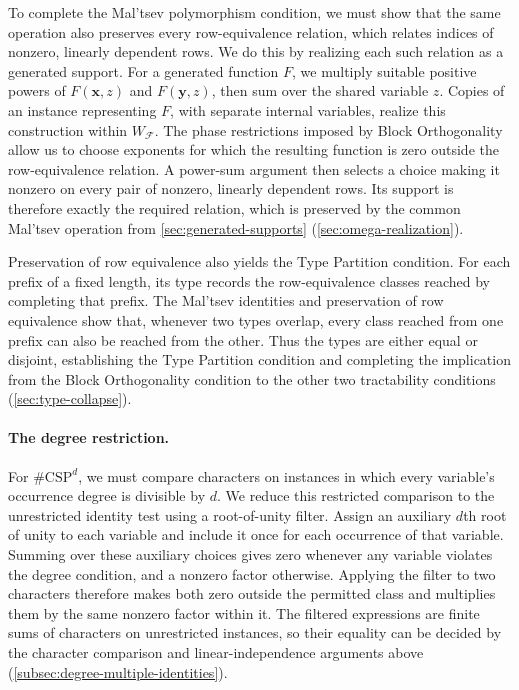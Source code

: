 \documentclass[11pt,letterpaper,onecolumn]{article}
\theoremstyle{plain}
\theoremstyle{definition}
\theoremstyle{remark}
\newcommand{\cF}{\mathcal F}
\begin{document}
To complete the Mal'tsev polymorphism condition, we must show that the same
operation also preserves every row-equivalence relation, which relates
indices of nonzero, linearly dependent rows.  We do this by realizing each
such relation as a generated support.  For a generated function $F$, we
multiply suitable positive powers of $F(\mathbf x,z)$ and $F(\mathbf y,z)$,
then sum over the shared variable $z$.  Copies of an instance representing
$F$, with separate internal variables, realize this construction within
$W_{\cF}$.  The phase restrictions imposed by Block Orthogonality allow us
to choose exponents for which the resulting function is zero outside the
row-equivalence relation.  A power-sum argument then selects a choice
making it nonzero on every pair of nonzero, linearly dependent rows.  Its
support is therefore exactly the required relation, which is preserved by
the common Mal'tsev operation from \cref{sec:generated-supports}
(\cref{sec:omega-realization}).

Preservation of row equivalence also yields the Type Partition condition.
For each prefix of a fixed length, its type records the row-equivalence
classes reached by completing that prefix.  The Mal'tsev identities and
preservation of row equivalence show that, whenever two types overlap,
every class reached from one prefix can also be reached from the other.
Thus the types are either equal or disjoint, establishing the Type Partition
condition and completing the implication from the Block Orthogonality
condition to the other two tractability conditions (\cref{sec:type-collapse}).

\paragraph{The degree restriction.}
For $\#\mathrm{CSP}^{d}$, we must compare characters on instances in which
every variable's occurrence degree is divisible by $d$.  We reduce this
restricted comparison to the unrestricted identity test using a root-of-unity
filter.  Assign an auxiliary $d$th root of unity to each variable and include
it once for each occurrence of that variable.  Summing over these auxiliary
choices gives zero whenever any variable violates the degree condition,
and a nonzero factor otherwise.  Applying the filter to two characters
therefore makes both zero outside the permitted class and multiplies them
by the same nonzero factor within it.  The filtered expressions are finite
sums of characters on unrestricted instances, so their equality can be
decided by the character comparison and linear-independence arguments above
(\cref{subsec:degree-multiple-identities}).
\end{document}
